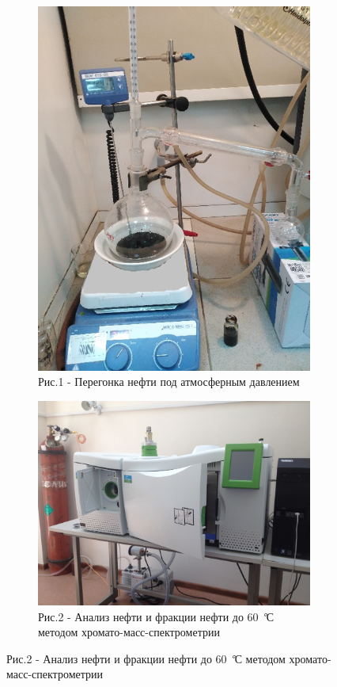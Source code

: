 \begin{figure}[H]
    \centering
    \begin{subfigure}[b]{0.33\textwidth}
        \centering
        \includegraphics[width=\textwidth]{assets/368}
        \caption*{Рис.1 - Перегонка нефти под атмосферным давлением}
    \end{subfigure}
    \hspace{0.5em}
    \begin{subfigure}[b]{0.58\textwidth}
        \centering
        \includegraphics[width=\textwidth]{assets/369}
        \caption*{Рис.2 - Анализ нефти и фракции нефти до 60 \emph{°}С методом хромато-масс-спектрометрии}
    \end{subfigure}
\end{figure}

